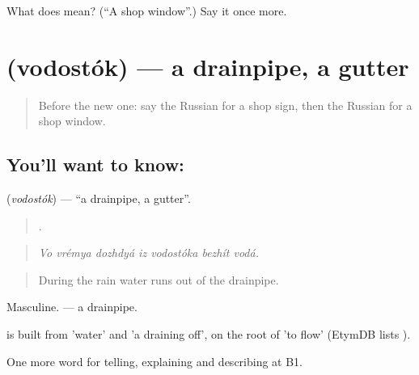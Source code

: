 \begin{tcolorbox}[breakable,colback=teal!4,colframe=teal!35!black,title={Before you move on}]
What does  mean? (\textquotedblleft{}A shop window\textquotedblright{}.) Say it once more.
\end{tcolorbox}
\section[\texorpdfstring{\ru{водосток} (vodostók)}{водосток (vodostók)}]{ (vodostók) — a drainpipe, a gutter}

\label{lesson:RU-C446-vodostok}



\begin{quote}
Before the new one: say the Russian for a shop sign, then the Russian for a shop window.
\end{quote}

\subsection*{You'll want to know: }
\textbf{} (\emph{vodostók}) — \textquotedblleft{}a drainpipe, a gutter\textquotedblright{}.

\begin{quote}
      .
\end{quote}

\begin{quote}
\emph{Vo vrémya dozhdyá iz vodostóka bezhít vodá.}
\end{quote}

\begin{quote}
During the rain water runs out of the drainpipe.
\end{quote}

Masculine. \emph{ } — a drainpipe.

\begin{cousinweb}
\emph{} is built from \emph{} 'water' and \emph{} 'a draining off', on the root of \emph{} 'to flow' (EtymDB lists \emph{}).
\end{cousinweb}

\begin{grammarlens}[title={What you've built}]
One more word for telling, explaining and describing at B1.
\end{grammarlens}

